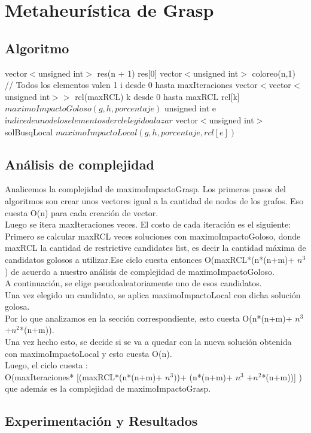\section{Metaheurística de Grasp}

\subsection{Algoritmo}

\begin{algorithm}[H]
\caption{} 
\begin{codebox}

\li vector$<$unsigned int$>$ res(n + 1)
\li res[0] 
\li
\li vector$<$unsigned int$>$ coloreo(n,1) // Todos los elementos valen 1
\li
\li \For i desde 0 hasta maxIteraciones \Do 
\li vector$<$vector$<$unsigned int$>>$ rcl(maxRCL)
\li 	\For k desde 0 hasta maxRCL \Do
\li 		rcl[k] \gets $maximoImpactoGoloso(g,h, porcentaje)$
		\End
\li
\li		unsigned int e \gets $índice de uno de los elementos de rcl elegido al azar$
\li
\li 	vector$<$unsigned int$>$ solBusqLocal \gets $maximoImpactoLocal(g,h,porcentaje,rcl[e])$
\li

\End
\end{codebox}
\end{algorithm}

\subsection{Análisis de complejidad}

\indent Analicemos la complejidad de maximoImpactoGrasp. Los primeros pasos del algoritmos son crear unos vectores igual a la cantidad de nodos de los grafos. Eso cuesta O(n) para cada creación de vector.\\
\indent Luego se itera maxIteraciones veces. El costo de cada iteración es el siguiente:\\
\indent Primero se calcular maxRCL veces soluciones con maximoImpactoGoloso, donde maxRCL la cantidad de restrictive candidates list, es decir la cantidad máxima de candidatos golosos a utilizar.Ese ciclo cuesta entonces O(maxRCL*(n*(n+m)+ $n^{3}$) de acuerdo a nuestro análisis de complejidad de maximoImpactoGoloso.\\
\indent A continuación, se elige pseudoaleatoriamente uno de esos candidatos.\\
\indent Una vez elegido un candidato, se aplica maximoImpactoLocal con dicha solución golosa.\\ Por lo que analizamos en la sección correspondiente, esto cuesta O(n*(n+m)+ $n^{3}$ +$ n^{2}$*(n+m)).\\
\indent Una vez hecho esto, se decide si se va a quedar con la nueva solución obtenida con maximoImpactoLocal y esto cuesta O(n).\\
\indent Luego, el ciclo cuesta :\\

O(maxIteraciones* [(maxRCL*(n*(n+m)+ $n^{3})$)+ (n*(n+m)+ $n^{3}$ +$ n^{2}$*(n+m))] )\\

 que además es la complejidad de maximoImpactoGrasp.\\


\subsection{Experimentación y Resultados}
